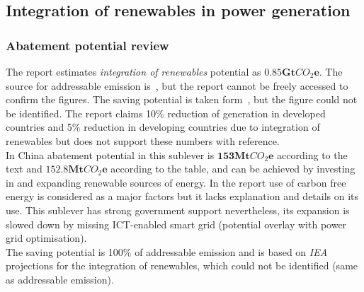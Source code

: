 \documentclass[11pt, twocolumn]{article}
\begin{document}
\subsection{Integration of renewables in power generation}
\subsubsection{Abatement potential review}
The report estimates \emph{integration of renewables} potential as $\mathbf{0.85Gt}CO_2\mathbf{e}$. The source for addressable emission is~\citep{iea:etp}, but the report cannot be freely accessed to confirm the figures. The saving potential is taken form~\citep{webb2008smart}, but the figure could not be identified. The report claims 10\% reduction of generation in developed countries and 5\% reduction in developing countries due to integration of renewables but does not support these numbers with reference.\\

In China abatement potential in this sublever is $\mathbf{153} \mathbf{Mt}CO_2\mathbf{e}$ according to the text and $\mathbf{152.8} \mathbf{Mt}CO_2\mathbf{e}$ according to the table, and can be achieved by investing in and expanding renewable sources of energy. In the report use of carbon free energy is considered as a major factors but it lacks explanation and details on its use. This sublever has strong government support nevertheless, its expansion is slowed down by missing ICT-enabled smart grid (potential overlay with power grid optimisation).\\
The saving potential is 100\% of addressable emission and is based on \emph{IEA} projections for the integration of renewables, which could not be identified (same as addressable emission).\\
\end{document}
